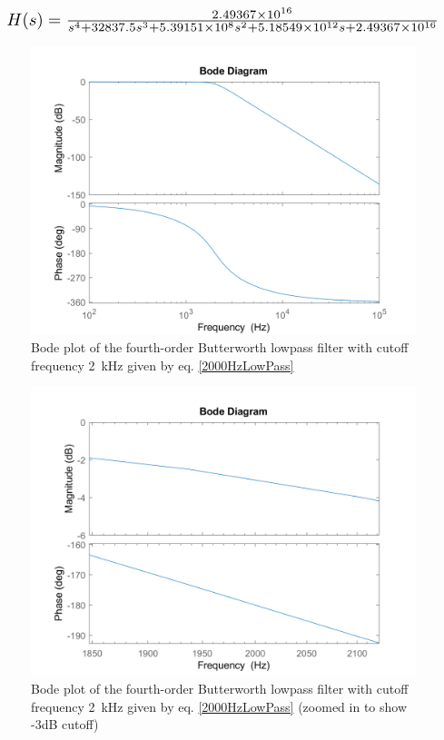 \documentclass[journal]{IEEEtran}
\begin{document}
\begin{equation}
    \resizebox{\columnwidth}{!}
    {$%
H(s)=\frac{2.49367\times 10^{16}}{s^4+32837.5 s^3+5.39151\times 10^8 s^2+5.18549\times 10^{12} s+2.49367\times 10^{16}}%
$}
\label{2000HzLowPass}
\end{equation}

\begin{figure}[ht]
	\centering
 \includegraphics[width=\columnwidth]{lpfBode.png}
    \caption{Bode plot of the fourth-order Butterworth lowpass filter with cutoff frequency \SI{2}{\kilo\hertz} given by eq. \eqref{2000HzLowPass}}
    \label{lpfBode}
\end{figure}

\begin{figure}[ht]
	\centering
  \includegraphics[width=\columnwidth]{lpfBodeZoomed.png}
    \caption{Bode plot of the fourth-order Butterworth lowpass filter with cutoff frequency \SI{2}{\kilo\hertz} given by eq. \eqref{2000HzLowPass} (zoomed in to show -3dB cutoff)}   
    \label{lpfBodeZoomed}
\end{figure}
\end{document}
